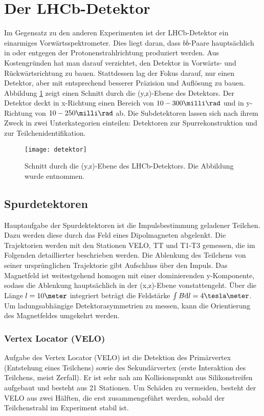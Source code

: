 \section{Der LHCb-Detektor}
Im Gegensatz zu den anderen Experimenten ist der LHCb-Detektor ein einarmiges Vorwärtsspektrometer. Dies liegt daran, dass $b\overline{b}$-Paare hauptsächlich in oder entgegen der Protonenstrahlrichtung produziert werden. Aus Kostengründen hat man darauf verzichtet, den Detektor in Vorwärts- und Rückwärtsrichtung zu bauen. Stattdessen lag der Fokus darauf, nur einen Detektor, aber mit entsprechend besserer Präzision und Auflösung zu bauen. Abbildung \ref{fig:detektor} zeigt einen Schnitt durch die (y,z)-Ebene des Detektors. Der Detektor deckt in x-Richtung einen Bereich von $10-300\milli\rad$ und in y-Richtung von $10-250\milli\rad$ ab. Die Subdetektoren lassen sich nach ihrem Zweck in zwei Unterkategorien einteilen: Detektoren zur Spurrekonstruktion und zur Teilchenidentifikation.

\begin{figure}[hptb]
\centering
\texttt{[image: detektor]}
\caption{Schnitt durch die (y,z)-Ebene des LHCb-Detektors. Die Abbildung wurde \cite{detector} entnommen.}
\label{fig:detektor}
\end{figure}


\subsection{Spurdetektoren}
Hauptaufgabe der Spurdektektoren ist die Impulsbestimmung geladener Teilchen. Dazu werden diese durch das Feld eines Dipolmagneten abgelenkt. Die Trajektorien werden mit den Stationen VELO, TT und T1-T3 gemessen, die im Folgenden detaillierter beschrieben werden. Die Ablenkung des Teilchens von seiner ursprünglichen Trajektorie gibt Aufschluss über den Impuls. Das Magnetfeld ist weitestgehend homogen mit einer dominierenden y-Komponente, sodass die Ablenkung hauptsächlich in der (x,z)-Ebene vonstattengeht. Über die Länge $l=10\meter$ integriert beträgt die Feldstärke $\int B\mathrm{d}l = 4\tesla\meter$. Um ladungsabhängige Detektorasymmetrien zu messen, kann die Orientierung des Magnetfeldes umgekehrt werden. \cite{thesis_linn}

\subsubsection{Vertex Locator (VELO)}
Aufgabe des Vertex Locator (VELO) ist die Detektion des Primärvertex (Entstehung eines Teilchens) sowie des Sekundärvertex (erste Interaktion des Teilchens, meist Zerfall). Er ist sehr nah am Kollisionspunkt aus Silikonstreifen aufgebaut und besteht aus 21 Stationen. Um Schäden zu vermeiden, besteht der VELO aus zwei Hälften, die erst zusammengeführt werden, sobald der Teilchenstrahl im Experiment stabil ist.

